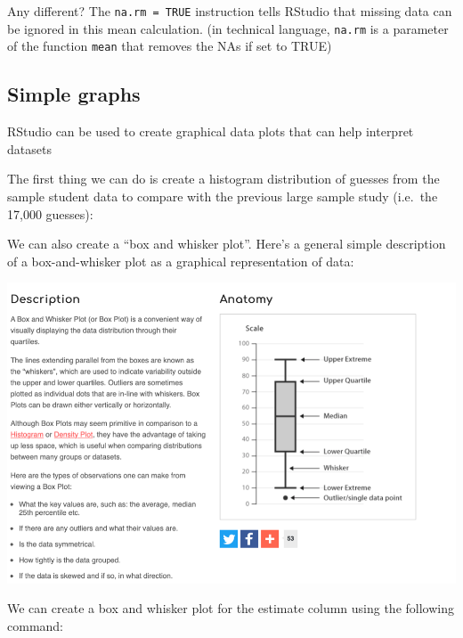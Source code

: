 \documentclass[
]{book}
\newenvironment{Shaded}{\begin{snugshade}}{\end{snugshade}}
\newcommand{\FunctionTok}[1]{\textcolor[rgb]{0.00,0.00,0.00}{#1}}
\newcommand{\NormalTok}[1]{#1}
\newcommand{\SpecialCharTok}[1]{\textcolor[rgb]{0.00,0.00,0.00}{#1}}
\begin{document}
Any different? The \texttt{na.rm\ =\ TRUE} instruction tells RStudio that missing data can be ignored in this mean calculation. (in technical language, \texttt{na.rm} is a parameter of the function \texttt{mean} that removes the NAs if set to TRUE)

\hypertarget{simple-graphs}{%
\subsection{Simple graphs}\label{simple-graphs}}

RStudio can be used to create graphical data plots that can help interpret datasets

The first thing we can do is create a histogram distribution of guesses from the sample student data to compare with the previous large sample study (i.e.~the 17,000 guesses):

\begin{Shaded}
\end{Shaded}

We can also create a ``box and whisker plot''. Here's a general simple description of a box-and-whisker plot as a graphical representation of data:

\includegraphics{files/Week_2/Box_and_whisker.png}

We can create a box and whisker plot for the estimate column using the following command:

\begin{Shaded}
\end{Shaded}
\end{document}
